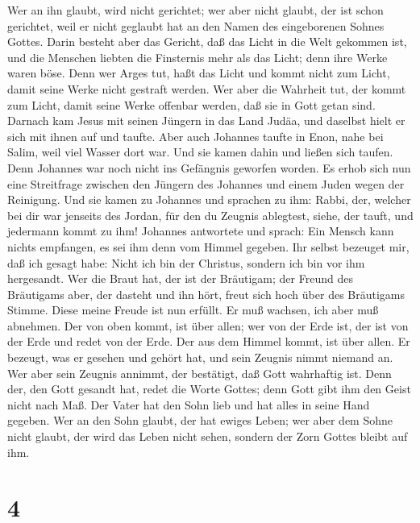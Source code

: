 Wer an ihn glaubt, wird nicht gerichtet; wer aber nicht glaubt, der ist
schon gerichtet, weil er nicht geglaubt hat an den Namen des
eingeborenen Sohnes Gottes.  Darin besteht aber das
Gericht, daß das Licht in die Welt gekommen ist, und die Menschen
liebten die Finsternis mehr als das Licht; denn ihre Werke waren böse.
 Denn wer Arges tut, haßt das Licht und kommt nicht zum
Licht, damit seine Werke nicht gestraft werden.  Wer aber
die Wahrheit tut, der kommt zum Licht, damit seine Werke offenbar
werden, daß sie in Gott getan sind.  Darnach kam Jesus
mit seinen Jüngern in das Land Judäa, und daselbst hielt er sich mit
ihnen auf und taufte.  Aber auch Johannes taufte in Enon,
nahe bei Salim, weil viel Wasser dort war. Und sie kamen dahin und
ließen sich taufen.  Denn Johannes war noch nicht ins
Gefängnis geworfen worden.  Es erhob sich nun eine
Streitfrage zwischen den Jüngern des Johannes und einem Juden wegen der
Reinigung.  Und sie kamen zu Johannes und sprachen zu
ihm: Rabbi, der, welcher bei dir war jenseits des Jordan, für den du
Zeugnis ablegtest, siehe, der tauft, und jedermann kommt zu ihm!
 Johannes antwortete und sprach: Ein Mensch kann nichts
empfangen, es sei ihm denn vom Himmel gegeben.  Ihr
selbst bezeuget mir, daß ich gesagt habe: Nicht ich bin der Christus,
sondern ich bin vor ihm hergesandt.  Wer die Braut hat,
der ist der Bräutigam; der Freund des Bräutigams aber, der dasteht und
ihn hört, freut sich hoch über des Bräutigams Stimme. Diese meine Freude
ist nun erfüllt.  Er muß wachsen, ich aber muß abnehmen.
 Der von oben kommt, ist über allen; wer von der Erde
ist, der ist von der Erde und redet von der Erde. Der aus dem Himmel
kommt, ist über allen.  Er bezeugt, was er gesehen und
gehört hat, und sein Zeugnis nimmt niemand an.  Wer aber
sein Zeugnis annimmt, der bestätigt, daß Gott wahrhaftig ist.
 Denn der, den Gott gesandt hat, redet die Worte Gottes;
denn Gott gibt ihm den Geist nicht nach Maß.  Der Vater
hat den Sohn lieb und hat alles in seine Hand gegeben. 
Wer an den Sohn glaubt, der hat ewiges Leben; wer aber dem Sohne nicht
glaubt, der wird das Leben nicht sehen, sondern der Zorn Gottes bleibt
auf ihm.

\hypertarget{section-3}{%
\section{4}\label{section-3}}

